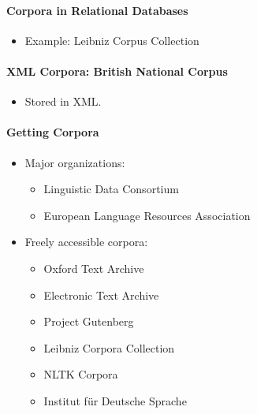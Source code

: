 \documentclass[a4paper, 11pt, accentcolor = tud3b]{tudreport}
\begin{document}
				\paragraph{Corpora in Relational Databases} %
					\begin{itemize}
						\item Example: Leibniz Corpus Collection
					\end{itemize}

                \paragraph{XML Corpora: British National Corpus} %
                    \begin{itemize}
                    	\item Stored in XML.
                    \end{itemize}

                \paragraph{Getting Corpora} %
                    \begin{itemize}
                    	\item Major organizations:
                    		\begin{itemize}
                    			\item Linguistic Data Consortium
                    			\item European Language Resources Association
                    		\end{itemize}
                    	\item Freely accessible corpora:
                    		\begin{itemize}
                    			\item Oxford Text Archive
                    			\item Electronic Text Archive
                    			\item Project Gutenberg
                    			\item Leibniz Corpora Collection
                    			\item NLTK Corpora
                    			\item Institut für Deutsche Sprache
                    		\end{itemize}
                    \end{itemize}
\end{document}
